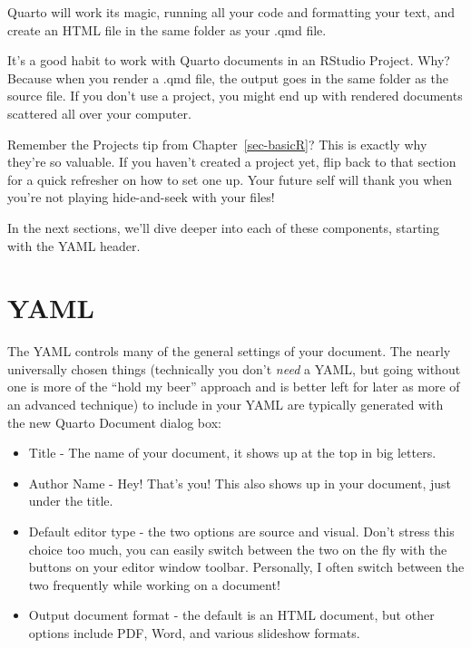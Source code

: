 \documentclass[
  letterpaper,
]{book}
\begin{document}
Quarto will work its magic, running all your code and formatting your
text, and create an HTML file in the same folder as your .qmd file.

\begin{tcolorbox}[enhanced jigsaw, colframe=quarto-callout-tip-color-frame, breakable, arc=.35mm, bottomtitle=1mm, bottomrule=.15mm, colbacktitle=quarto-callout-tip-color!10!white, rightrule=.15mm, colback=white, opacityback=0, opacitybacktitle=0.6, coltitle=black, left=2mm, toptitle=1mm, toprule=.15mm, titlerule=0mm, leftrule=.75mm, title=\textcolor{quarto-callout-tip-color}{\faLightbulb}\hspace{0.5em}{Tip from the Helpdesk: Projects Make Perfect}]

It's a good habit to work with Quarto documents in an RStudio Project.
Why? Because when you render a .qmd file, the output goes in the same
folder as the source file. If you don't use a project, you might end up
with rendered documents scattered all over your computer.

Remember the Projects tip from Chapter~\ref{sec-basicR}? This is exactly
why they're so valuable. If you haven't created a project yet, flip back
to that section for a quick refresher on how to set one up. Your future
self will thank you when you're not playing hide-and-seek with your
files!

\end{tcolorbox}

In the next sections, we'll dive deeper into each of these components,
starting with the YAML header.

\section{YAML}\label{yaml}

The YAML controls many of the general settings of your document. The
nearly universally chosen things (technically you don't \emph{need} a
YAML, but going without one is more of the ``hold my beer'' approach and
is better left for later as more of an advanced technique) to include in
your YAML are typically generated with the new Quarto Document dialog
box:

\begin{itemize}
\item
  Title - The name of your document, it shows up at the top in big
  letters.
\item
  Author Name - Hey! That's you! This also shows up in your document,
  just under the title.
\item
  Default editor type - the two options are source and visual. Don't
  stress this choice too much, you can easily switch between the two on
  the fly with the buttons on your editor window toolbar. Personally, I
  often switch between the two frequently while working on a document!
\item
  Output document format - the default is an HTML document, but other
  options include PDF, Word, and various slideshow formats.
\end{itemize}
\end{document}
